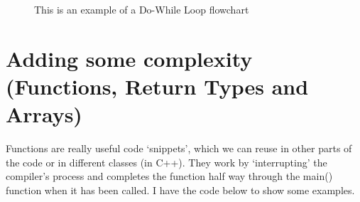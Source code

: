 \documentclass[a4paper,12pt]{article}
\begin{document}
\begin{figure}[H]
\centering
{}
    \caption{This is an example of a Do-While Loop flowchart}
    \label{fig:DoWhile}
\end{figure}

\hrulefill

\newpage

\section{Adding some complexity (Functions, Return Types and Arrays)}

Functions are really useful code `snippets', which we can reuse in other parts of the code or in different classes (in C++). They work by `interrupting' the compiler's process and completes the function half way through the main() function when it has been called. I have the code below to show some examples.
\end{document}
